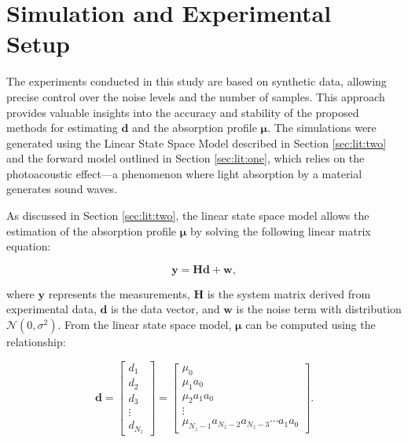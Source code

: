 \section{Simulation and Experimental Setup} \label{sec:method}

The experiments conducted in this study are based on synthetic data, allowing precise control over the noise levels and the number of samples. This approach provides valuable insights into the accuracy and stability of the proposed methods for estimating \( \mathbf{d} \) and the absorption profile \( \mathbf{\mu} \). The simulations were generated using the Linear State Space Model described in Section \ref{sec:lit:two} and the forward model outlined in Section \ref{sec:lit:one}, which relies on the photoacoustic effect—a phenomenon where light absorption by a material generates sound waves.

As discussed in Section \ref{sec:lit:two}, the linear state space model allows the estimation of the absorption profile \( \mathbf{\mu} \) by solving the following linear matrix equation:

\begin{equation} \label{eq:linear}
    \mathbf{y} = \mathbf{H} \mathbf{d} + \mathbf{w},
\end{equation}

where \( \mathbf{y} \) represents the measurements, \( \mathbf{H} \) is the system matrix derived from experimental data, \( \mathbf{d} \) is the data vector, and \( \mathbf{w} \) is the noise term with distribution \( \mathcal{N}(0, \sigma^2) \). From the linear state space model, \( \mathbf{\mu} \) can be computed using the relationship:

\begin{equation}
    \mathbf{d} = \begin{bmatrix}
                    d_1 \\
                    d_2 \\
                    d_3 \\
                    \vdots \\
                    d_{N_z}    
                \end{bmatrix}
             =
                \begin{bmatrix}
                    \mu_0 \\
                    \mu_1 a_0 \\
                    \mu_2 a_1 a_0 \\
                    \vdots \\
                    \mu_{N_z -1} a_{N_z - 2} a_{N_z - 3} \cdots a_1 a_0
                \end{bmatrix}.
\end{equation}

